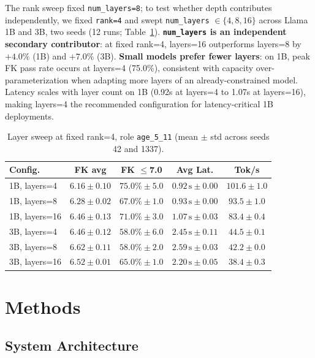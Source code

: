 \documentclass[pdflatex,sn-mathphys-num]{sn-jnl}%
\begin{document}
The rank sweep fixed \texttt{num\_layers=8}; to test whether depth contributes independently, we fixed \texttt{rank=4} and swept \texttt{num\_layers} $\in \{4, 8, 16\}$ across Llama 1B and 3B, two seeds (12 runs; Table~\ref{tab:layersweep}). \textbf{\texttt{num\_layers} is an independent secondary contributor}: at fixed rank=4, layers=16 outperforms layers=8 by $+4.0\%$ (1B) and $+7.0\%$ (3B). \textbf{Small models prefer fewer layers}: on 1B, peak FK pass rate occurs at layers=4 (75.0\%), consistent with capacity over-parameterization when adapting more layers of an already-constrained model. Latency scales with layer count on 1B (0.92s at layers=4 to 1.07s at layers=16), making layers=4 the recommended configuration for latency-critical 1B deployments.

\begin{table}[!h]
  \centering
  \caption{Layer sweep at fixed rank=4, role \texttt{age\_5\_11} (mean $\pm$ std across seeds 42 and 1337).}
  \label{tab:layersweep}
  \small
  \begin{tabular}{@{}lcccc@{}}
    \toprule
    Config. & FK avg & FK $\leq$7.0 & Avg Lat. & Tok/s \\
    \midrule
    1B, layers=4  & $6.16 \pm 0.10$ & $75.0\% \pm 5.0$ & $0.92\,\text{s} \pm 0.00$ & $101.6 \pm 1.0$ \\
    1B, layers=8  & $6.28 \pm 0.02$ & $67.0\% \pm 1.0$ & $0.93\,\text{s} \pm 0.00$ & $93.5 \pm 1.0$  \\
    1B, layers=16 & $6.46 \pm 0.13$ & $71.0\% \pm 3.0$ & $1.07\,\text{s} \pm 0.03$ & $83.4 \pm 0.4$  \\
    3B, layers=4  & $6.46 \pm 0.12$ & $58.0\% \pm 6.0$ & $2.45\,\text{s} \pm 0.11$ & $44.5 \pm 0.1$  \\
    3B, layers=8  & $6.62 \pm 0.11$ & $58.0\% \pm 2.0$ & $2.59\,\text{s} \pm 0.03$ & $42.2 \pm 0.0$  \\
    3B, layers=16 & $6.52 \pm 0.01$ & $65.0\% \pm 1.0$ & $2.20\,\text{s} \pm 0.05$ & $38.4 \pm 0.3$  \\
    \bottomrule
  \end{tabular}
\end{table}

\section{Methods}\label{sec:methodology}

\subsection{System Architecture}\label{sec:architecture}
\end{document}
